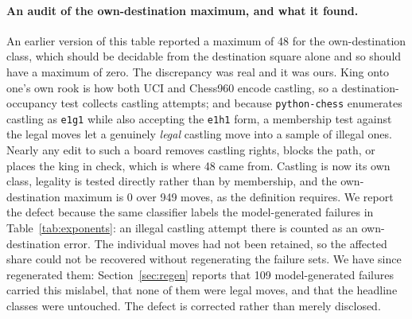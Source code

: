 \documentclass[11pt]{article}
\begin{document}
\paragraph{An audit of the own-destination maximum, and what it found.}
An earlier version of this table reported a maximum of 48 for the own-destination
class, which should be decidable from the destination square alone and so should
have a maximum of zero. The discrepancy was real and it was ours. King onto one's
own rook is how both UCI and Chess960 encode castling, so a destination-occupancy
test collects castling attempts; and because \texttt{python-chess} enumerates
castling as \texttt{e1g1} while also accepting the \texttt{e1h1} form, a
membership test against the legal moves let a genuinely \emph{legal} castling move
into a sample of illegal ones. Nearly any edit to such a board removes castling
rights, blocks the path, or places the king in check, which is where 48 came from.
Castling is now its own class, legality is tested directly rather than by
membership, and the own-destination maximum is 0 over 949 moves, as the
definition requires. We report the defect because the same classifier labels the
model-generated failures in Table~\ref{tab:exponents}: an illegal castling attempt there
is counted as an own-destination error. The individual moves had not been retained, so the affected share could not be
recovered without regenerating the failure sets. We have since regenerated them:
Section~\ref{sec:regen} reports that 109 model-generated failures carried
this mislabel, that none of them were legal moves, and that the headline classes were
untouched. The defect is corrected rather than merely disclosed.
\end{document}
